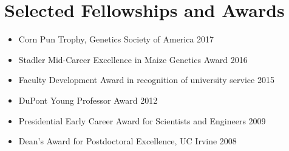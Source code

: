 \section*{Selected Fellowships and Awards}
\setlength\itemsep{0ex}
\begin {itemize}
\setlength\itemsep{0ex}
\item Corn Pun Trophy, Genetics Society of America 2017
\item Stadler Mid-Career Excellence in Maize Genetics Award 2016
\item Faculty Development Award in recognition of university service 2015
\item DuPont Young Professor Award 2012
\item Presidential Early Career Award for Scientists and Engineers 2009
\item Dean's Award for Postdoctoral Excellence, UC Irvine 2008
\end{itemize}

